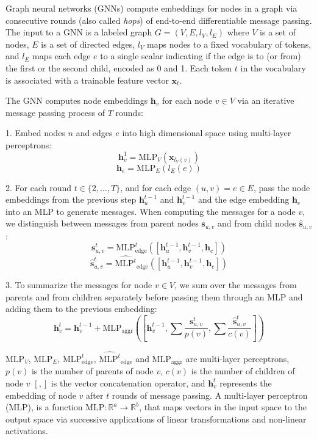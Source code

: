 \documentclass[letterpaper]{article} \usepackage{aaai20}  \usepackage{times}  \usepackage{helvet} \usepackage{courier}  \usepackage[hyphens]{url}  \usepackage{graphicx} \urlstyle{rm} \def\UrlFont{\rm}  \usepackage{graphicx}  \frenchspacing  \setlength{\pdfpagewidth}{8.5in}  \setlength{\pdfpageheight}{11in}
\begin{document}
Graph neural networks (GNNs) compute embeddings for nodes in a graph via consecutive rounds (also called \emph{hops}) of end-to-end differentiable message passing.
The input to a GNN is a labeled graph $G = (V, E, l_V, l_E)$ where $V$ is a set of nodes, $E$ is a set of directed edges, $l_V$ maps nodes to a fixed vocabulary of tokens, and $l_E$ maps each edge $e$ to a single scalar indicating if the edge is to (or from) the first or the second child, encoded as 0 and 1.
Each token $t$ in the vocabulary is associated with a trainable feature vector $\bm x_t$.

The GNN computes node embeddings $\bm{h}_v$ for each node $v \in V$ via an iterative message passing process of $T$ rounds:

    1. Embed nodes $n$ and edges $e$ into high dimensional space using multi-layer perceptrons:
    $$\bm{h}_v^1 = \textrm{MLP}_V(\bm{x}_{l_V(v)})$$
    $$\bm{h}_e = \textrm{MLP}_E(l_E(e))$$

    2. For each round $t \in \{2, \dots, T\}$, and for each edge $(u,v) = e \in E$, pass the node embeddings from the previous step $\bm{h}^{t-1}_u$ and $\bm{h}^{t-1}_v$ and the edge embedding $\bm{h}_e$ into an MLP to generate messages. 
    When computing the messages for a node $v$, we distinguish between messages from parent nodes $\bm s_{u,v}$ and from child nodes $\hat{\bm s}_{u,v}$:
    $$\bm{s}_{u,v}^t = \textrm{MLP}^t_{\textrm{edge}}([\bm{h}_u^{t-1}, \bm{h}_v^{t-1}, \bm{h}_e])$$
    $$\hat{\bm{s}}^{t}_{u,v} = \hat{\textrm{MLP}^t}_{\textrm{edge}}([\bm{h}_u^{t-1}, \bm{h}_v^{t-1}, \bm{h}_e])$$

    3. To summarize the messages for node $v \in V$, we sum over the messages from parents and from children separately before passing them through an MLP and adding them to the previous embedding: 
    $$\bm{h}_v^{t} = \bm{h}_v^{t-1} + \textrm{MLP}_{\textrm{aggr}}\left(\left[\bm{h}_v^{t-1}, \sum\frac{\bm{s}^{t}_{u, v}}{p(v)}, \sum \frac{\hat{\bm{s}}^{t}_{u,v}}{c(v)}\right]\right)$$

$\textrm{MLP}_V$, $\textrm{MLP}_E$, $\textrm{MLP}^t_{\textrm{edge}}$, $\hat{\textrm{MLP}^t}_{\textrm{edge}}$ and $\textrm{MLP}_{\textrm{aggr}}$ are multi-layer perceptrons, $p(v)$ is the number of parents of node $v$, $c(v)$ is the number of children of node $v$ $\left[,\right]$ is the vector concatenation operator, and $\bm{h}_v^t$ represents the embedding of node $v$ after $t$ rounds of message passing. A multi-layer perceptron ($\textrm{MLP}$), is a function $\textrm{MLP}: \mathbb{R}^a \to \mathbb{R}^b$, that maps vectors in the input space to the output space via successive applications of linear transformations and non-linear activations.
\end{document}
